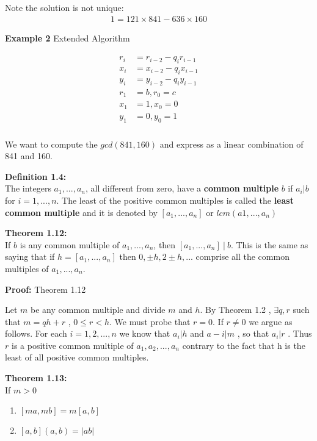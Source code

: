 \documentclass[a4paper]{article}
\begin{document}
Note the solution is not unique:
\begin{align}
1=121\times841 - 636\times 160
\end{align}

\textbf{Example 2} Extended Algorithm


\begin{align}
\begin{split}
r_i&=r_{i-2} - q_ir_{i-1} \\
x_i&=x_{i-2} - q_ix_{i-1} \\
y_i&=y_{i-2} - q_iy_{i-1} \\
r_1&=b , r_0=c \\
x_1&=1 , x_0=0 \\
y_1&=0 , y_0=1 \\
\end{split}
\end{align}



We want to compute the $gcd(841,160)$ and express as a linear combination
of 841 and 160.


\textbf{Definition 1.4:}\\
The integers $a_1,...,a_n$, all different from zero, have a
\textbf{common multiple} $b$ if $a_i|b$ for $i=1,...,n$. The least of
the positive common multiples is called the
\textbf{least common multiple} and it is denoted by
$[a_1,...,a_n]$ or $lcm(a1,...,a_n)$

\textbf{Theorem 1.12:}\\
If $b$ is any common multiple of $a_1,...,a_n$,
then $[a_1,...,a_n]\ |\ b$. This is the same as saying that if $h=[a_1,...,a_n]$
then $0,\pm h,2\pm h,...$ comprise all the common multiples of $a_1,...,a_n$.

\textbf{Proof:} Theorem 1.12

Let $m$ be any common multiple and divide $m$ and $h$. By Theorem 1.2 , $\exists
q,r$ such that $m=qh+r$ , $ 0\leq r<h.$ We must probe that $r=0$. If $r\neq0$
we argue as follows. For each $i=1,2,...,n$ we know that $a_i|h$ and $a-i|m$
, so that $a_i|r$ . Thus $r$ is a positive common multiple of $a_1,a_2,...,a_n$
contrary to the fact that h is the least of all positive common multiples.


\textbf{Theorem 1.13:}\\
If $m>0$
\begin{enumerate}
    \item $[ma,mb] = m[a,b]$
    \item $[a,b](a,b)=|ab|$
\end{enumerate}
\end{document}
